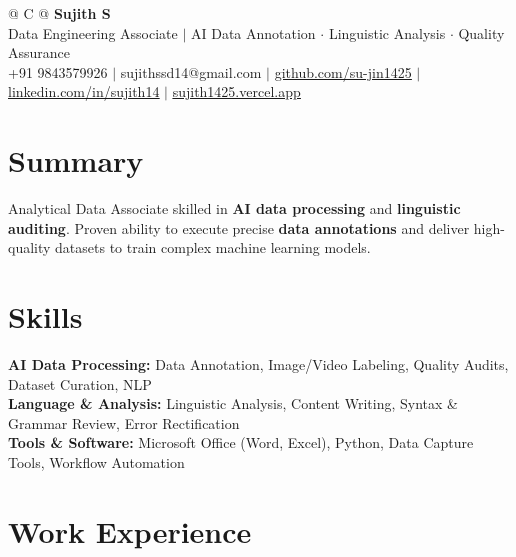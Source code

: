 \documentclass[a4paper,10pt]{article}
\newcommand{\ulink}[2]{\href{#1}{\uline{#2}}}
\begin{document}
\pagestyle{empty}

\begin{tabularx}{\linewidth}{@{} C @{}}
{\color[HTML]{000000}\fontsize{30}{35}\selectfont\bfseries Sujith S} \\[5pt]
{\fontsize{10.5}{12.5}\selectfont\color[HTML]{3A3A3A}
Data Engineering Associate $|$ AI Data Annotation $\cdot$ Linguistic Analysis $\cdot$ Quality Assurance} \\[6pt]
{\fontsize{9.5}{11.5}\selectfont\textcolor[HTML]{3A3A3A}{+91 9843579926 $|$ sujithssd14@gmail.com $|$ \ulink{https://github.com/su-jin1425}{github.com/su-jin1425} $|$ \ulink{https://linkedin.com/in/sujith14}{linkedin.com/in/sujith14} $|$ \ulink{https://sujith1425.vercel.app}{sujith1425.vercel.app}}}
\end{tabularx}

\vspace{2pt}

\section{Summary}
\vspace{1pt}
{\color[HTML]{0A0A0A}\fontsize{11}{14}\selectfont
Analytical Data Associate skilled in \textbf{AI data processing} and \textbf{linguistic auditing}. Proven ability to execute precise \textbf{data annotations} and deliver high-quality datasets to train complex machine learning models.}

\vspace{1pt}

\section{Skills}
\vspace{1pt}
{\color[HTML]{0A0A0A}\fontsize{11}{14}\selectfont
\textbf{AI Data Processing:} Data Annotation, Image/Video Labeling, Quality Audits, Dataset Curation, NLP \\[2pt]
\textbf{Language \& Analysis:} Linguistic Analysis, Content Writing, Syntax \& Grammar Review, Error Rectification \\[2pt]
\textbf{Tools \& Software:} Microsoft Office (Word, Excel), Python, Data Capture Tools, Workflow Automation}

\vspace{1pt}

\section{Work Experience}
\vspace{1pt}
\end{document}
